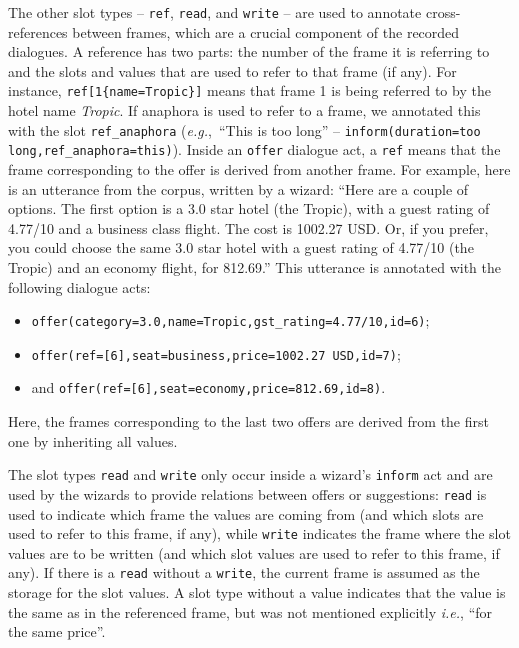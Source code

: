 \documentclass{article}
\theoremstyle{definition}
\newenvironment{example}{\quotation}{\endquotation}
\begin{document}
The other slot types -- \texttt{ref}, \texttt{read}, and \texttt{write} -- are used to annotate cross-references between frames, which are a crucial component of the recorded dialogues. A reference has two parts: the number of the frame it is referring to and the slots and values that are used to refer to that frame (if any). For instance, \texttt{ref[1\{name=Tropic\}]} means that frame 1 is being referred to by the hotel name \textit{Tropic}.
If anaphora is used to refer to a frame, we annotated this with the slot \texttt{ref\_anaphora} (\textit{e.g.},~``This is too long'' -- \texttt{inform(duration=too long,ref\_anaphora=this)}).
Inside an \texttt{offer} dialogue act, a \texttt{ref} means that the frame corresponding to the offer is derived from another frame. For example, here is an utterance from the corpus, written by a wizard:
\begin{example}
``Here are a couple of options. The first option is a 3.0 star hotel (the Tropic), with a guest rating of 4.77/10 and a business class flight. The cost is 1002.27 USD. Or, if you prefer, you could choose the same 3.0 star hotel with a guest rating of 4.77/10 (the Tropic) and an economy flight, for 812.69.''
\end{example}
This utterance is annotated with the following dialogue acts:
\begin{itemize}[noitemsep]
\item \texttt{offer(category=3.0,name=Tropic,gst\_rating=4.77/10,id=6)};
\item\texttt{offer(ref=[6],seat=business,price=1002.27 USD,id=7)};
\item and \texttt{offer(ref=[6],seat=economy,price=812.69,id=8)}.
\end{itemize}
Here, the frames corresponding to the last two offers are derived from the first one by inheriting all values. 

The slot types \texttt{read} and \texttt{write} only occur inside a wizard's \texttt{inform} act and are used by the wizards to provide relations between offers or suggestions: \texttt{read} is used to indicate which frame the values are coming from (and which slots are used to refer to this frame, if any), while \texttt{write} indicates the frame where the slot values are to be written (and which slot values are used to refer to this frame, if any). If there is a \texttt{read} without a \texttt{write}, the current frame is assumed as the storage for the slot values. A slot type without a value indicates that the value is the same as in the referenced frame, but was not mentioned explicitly \textit{i.e.}, ``for the same price''.
\end{document}
